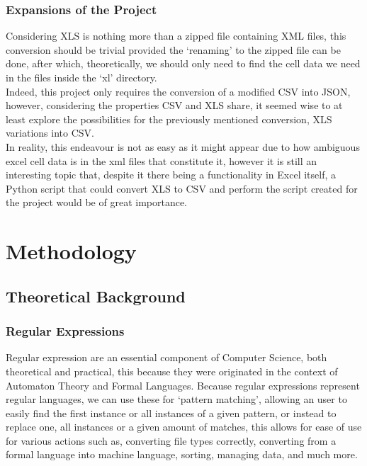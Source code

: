 \documentclass[11pt,a4paper,times]{report}
\begin{document}
\subsubsection{Expansions of the Project}Considering XLS is nothing more
than a zipped file containing XML files, this conversion should be 
trivial provided the `renaming' to the zipped file can be done, after
which, theoretically, we should only need to find the cell data we need
in the files inside the `xl' directory.
\\
Indeed, this project only requires the conversion of a modified CSV into
JSON, however, considering the properties CSV and XLS share, it seemed
wise to at least explore the possibilities for the previously
mentioned conversion, XLS variations into CSV.
\\
In reality, this endeavour is not as easy as it might appear due to
how ambiguous excel cell data is in the xml files that constitute it,
however it is still an interesting topic that, despite it there being a
functionality in Excel itself, a Python script that could convert XLS to 
CSV and perform the script created for the project would be of 
great importance.

\section{Methodology} \label{methodology}
\subsection{Theoretical Background} \label{theory}
\subsubsection{Regular Expressions}Regular expression are an essential
component of Computer Science, both theoretical and practical, this
because they were originated in the context of Automaton Theory and Formal Languages.   
Because regular expressions represent regular languages, we can use 
these for `pattern matching', allowing an user to easily find the first 
instance or all instances of a given pattern, or instead to replace one,
all instances or a given amount of matches, this allows for ease of use
for various actions such as, converting file types correctly, converting
from a formal language into machine language, sorting, managing data,
and much more.
\end{document}
